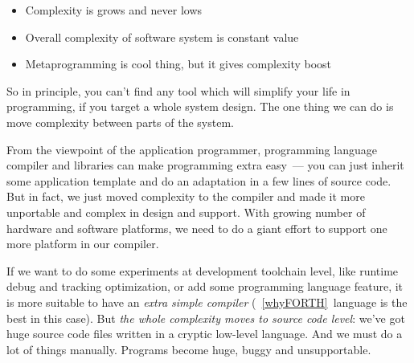\clearpage{}

\begin{itemize}[nosep]
  \item 
Complexity is grows and never lows
  \item
Overall complexity of software system is constant value
  \item
Metaprogramming is cool thing, but it gives complexity boost
\end{itemize}
\bigskip
\noindent
So in principle, you can't find any tool which will simplify your life in
programming, if you target a whole system design. The one thing we can do is
move complexity between parts of the system.

From the viewpoint of the application programmer, programming language compiler
and libraries can make programming extra easy\ --- you can just inherit some
application template and do an adaptation in a few lines of source code. But in
fact, we just moved complexity to the compiler and made it more unportable and
complex in design and support. With growing number of hardware and software
platforms, we need to do a giant effort to support one more platform in our
compiler.

If we want to do some experiments at development toolchain level, like runtime
debug and tracking optimization, or add some programming language feature, it is
more suitable to have an \textit{extra simple compiler} (\F\ \ref{whyFORTH}\
language is the best in this case). But \emph{the whole complexity moves to
source code level}: we've got huge source code files written in a cryptic
low-level language. And we must do a lot of things manually. Programs become
huge, buggy and unsupportable.
